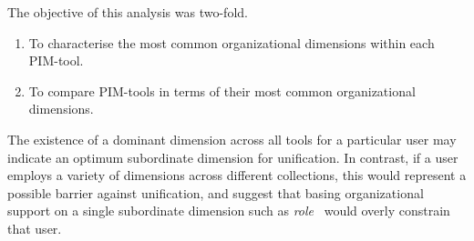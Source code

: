 The objective of this analysis was two-fold.
\begin{enumerate}
\item To characterise the most common organizational dimensions within each PIM-tool. 
\item To compare PIM-tools in terms of their most common organizational dimensions.
\end{enumerate}

%
The existence of a dominant dimension across all tools for a particular user may indicate an optimum subordinate dimension for unification.  In contrast, if a user employs a variety of dimensions across different collections, this would represent a possible barrier against unification, and suggest that basing organizational support on a single subordinate dimension such as \textit{role}~\citep{Shneiderman:94} would overly constrain that user.

